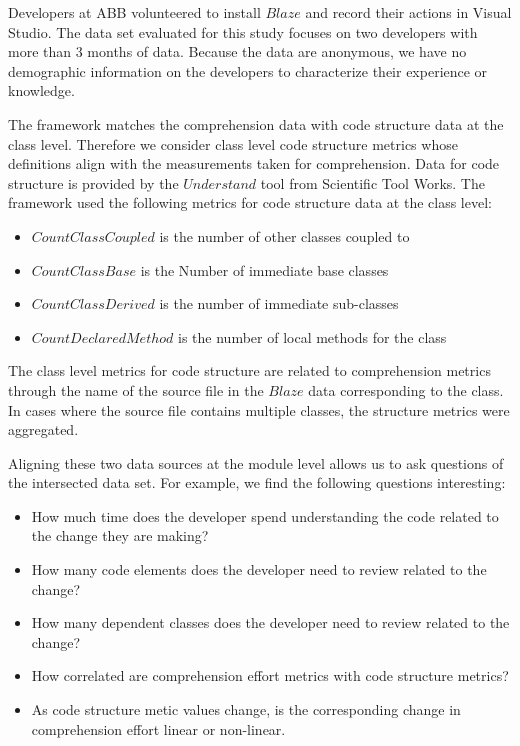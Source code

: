 Developers at ABB volunteered to install $Blaze$ and record their actions in Visual Studio.  The data set evaluated for this study focuses on two developers with more than 3 months of data.  Because the data are anonymous, we have no demographic information on the developers to characterize their experience or knowledge.

The framework matches the comprehension data with code structure data at the class level.  Therefore we consider class level code structure metrics whose definitions align with the measurements taken for comprehension.  Data for code structure is provided by the $Understand$ tool from Scientific Tool Works.  The framework used the following metrics for code structure data at the class level:

\begin{itemize}
	\item[] $Count Class Coupled$ is the number of other classes coupled to
	\item[] $Count Class Base$ is the Number of immediate base classes
	\item[] $Count Class Derived$ is the number of immediate sub-classes
	\item[] $Count Declared Method$ is the number of local methods for the class
\end{itemize}

The class level metrics for code structure are related to comprehension metrics through the name of the source file in the $Blaze$ data corresponding to the class.  In cases where the source file contains multiple classes, the structure metrics were aggregated.

Aligning these two data sources at the module level allows us to ask questions of the intersected data set.  For example, we find the following questions interesting:

\begin{itemize}
	\item[] How much time does the developer spend understanding the code related to the change they are making?
	\item[] How many code elements does the developer need to review related to the change?
	\item[] How many dependent classes does the developer need to review related to the change?
	\item[] How correlated are comprehension effort metrics with code structure metrics?
	\item[] As code structure metic values change, is the corresponding change in comprehension effort linear or non-linear.
\end{itemize}